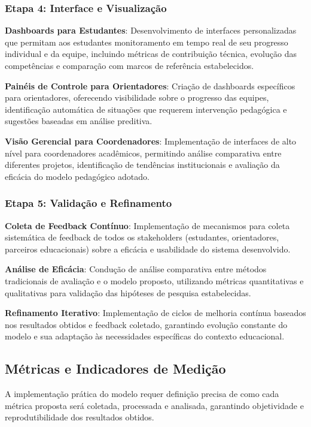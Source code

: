\documentclass[12pt, a4paper, oneside, brazilian]{abntex2}
\begin{document}
\subsubsection{Etapa 4: Interface e Visualização}

\textbf{Dashboards para Estudantes}: Desenvolvimento de interfaces personalizadas que permitam aos estudantes monitoramento em tempo real de seu progresso individual e da equipe, incluindo métricas de contribuição técnica, evolução das competências e comparação com marcos de referência estabelecidos.

\textbf{Painéis de Controle para Orientadores}: Criação de dashboards específicos para orientadores, oferecendo visibilidade sobre o progresso das equipes, identificação automática de situações que requerem intervenção pedagógica e sugestões baseadas em análise preditiva.

\textbf{Visão Gerencial para Coordenadores}: Implementação de interfaces de alto nível para coordenadores acadêmicos, permitindo análise comparativa entre diferentes projetos, identificação de tendências institucionais e avaliação da eficácia do modelo pedagógico adotado.

\subsubsection{Etapa 5: Validação e Refinamento}

\textbf{Coleta de Feedback Contínuo}: Implementação de mecanismos para coleta sistemática de feedback de todos os stakeholders (estudantes, orientadores, parceiros educacionais) sobre a eficácia e usabilidade do sistema desenvolvido.

\textbf{Análise de Eficácia}: Condução de análise comparativa entre métodos tradicionais de avaliação e o modelo proposto, utilizando métricas quantitativas e qualitativas para validação das hipóteses de pesquisa estabelecidas.

\textbf{Refinamento Iterativo}: Implementação de ciclos de melhoria contínua baseados nos resultados obtidos e feedback coletado, garantindo evolução constante do modelo e sua adaptação às necessidades específicas do contexto educacional.

\subsection{Métricas e Indicadores de Medição}

A implementação prática do modelo requer definição precisa de como cada métrica proposta será coletada, processada e analisada, garantindo objetividade e reprodutibilidade dos resultados obtidos.
\end{document}
